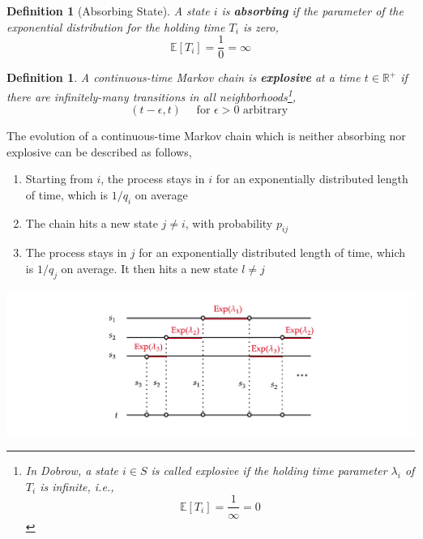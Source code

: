 \documentclass{tufte-handout}
\newtheorem{defn}[thm]{Definition}
\begin{document}
\begin{defn}[Absorbing State]
  A state $i$ is \textbf{absorbing} if the parameter of the exponential distribution for the holding time $T_i$ is zero,
  \[\mathbb{E}[T_i] = \frac{1}{0} = \infty\]
\end{defn}

\begin{defn}
  A continuous-time Markov chain is \textbf{explosive} at a time $t \in \mathbb{R}^+$ if there are infinitely-many transitions in all neighborhoods\footnote{In Dobrow, a state $i \in S$ is called explosive if the holding time parameter $\lambda_i$ of $T_i$ is infinite, i.e., \[\mathbb{E}[T_i] = \frac{1}{\infty} = 0\]},
  \[(t-\epsilon, t) \quad \text{ for } \epsilon > 0 \text{ arbitrary }\]
\end{defn}

The evolution of a continuous-time Markov chain which is neither absorbing nor explosive can be described as follows,
\begin{enumerate}
  \item Starting from $i$, the process stays in $i$ for an exponentially distributed length of time, which is $1 / q_i$ on average
  \item The chain hits a new state $j \neq i$, with probability $p_{ij}$
  \item The process stays in $j$ for an exponentially distributed length of time, which is $1 / q_j$ on average. It then hits a new state $l \neq j$
\end{enumerate}

\includegraphics[width=\textwidth]{fig-25.png}
\end{document}
